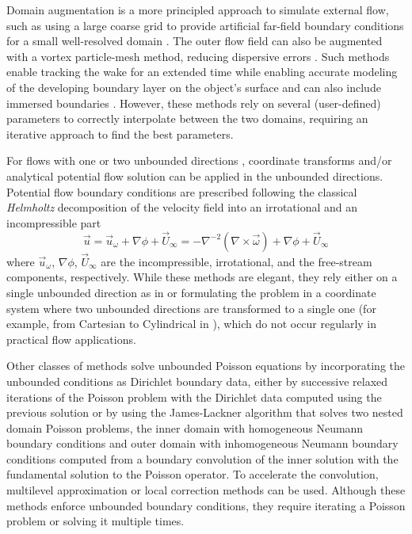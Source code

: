\documentclass[final,1p,times]{elsarticle}
\begin{document}
Domain augmentation is a more principled approach to simulate external flow, such as using a large coarse grid to provide artificial far-field boundary conditions for a small well-resolved domain \cite{Colonius2008}. The outer flow field can also be augmented with a vortex particle-mesh method, reducing dispersive errors \cite{Billuart2023AFlows}. Such methods enable tracking the wake for an extended time while enabling accurate modeling of the developing boundary layer on the object's surface and can also include immersed boundaries \cite{Marichal2015UnboundedMethods}. However, these methods rely on several (user-defined) parameters to correctly interpolate between the two domains, requiring an iterative approach to find the best parameters.

For flows with one \cite{Grosch1977NumericalTransforms} or two unbounded directions \cite{Rennich1997NumericalDirections, Levy2022SolvingMethod}, coordinate transforms and/or analytical potential flow solution \cite{Tsynkov1998NumericalReview} can be applied in the unbounded directions. Potential flow boundary conditions are prescribed following the classical \emph{Helmholtz} decomposition of the velocity field into an irrotational and an incompressible part
\begin{equation}\label{eq:u_vort}
    \vec{u} = \vec{u}_\omega + \nabla\phi + \vec{U}_\infty = -\nabla^{-2}\left(\nabla \times \vec{\omega}\right) + \nabla\phi + \vec{U}_\infty
\end{equation}
where $\vec{u}_\omega$, $\nabla\phi$, $\vec{U}_\infty$ are the incompressible, irrotational, and the free-stream components, respectively. While these methods are elegant, they rely either on a single unbounded direction as in \cite{Grosch1977NumericalTransforms} or formulating the problem in a coordinate system where two unbounded directions are transformed to a single one (for example, from Cartesian to Cylindrical in \cite{Levy2022SolvingMethod}), which do not occur regularly in practical flow applications.

Other classes of methods solve unbounded Poisson equations by incorporating the unbounded conditions as Dirichlet boundary data, either by successive relaxed iterations of the Poisson problem with the Dirichlet data computed using the previous solution \cite{Miller2008AnBoundaries} or by using the James-Lackner \cite{Jamb1977TheDistributions, Lackner1976COMPUTATIONEQUILIBRIA} algorithm that solves two nested domain Poisson problems, the inner domain with homogeneous Neumann boundary conditions and outer domain with inhomogeneous Neumann boundary conditions computed from a boundary convolution of the inner solution with the fundamental solution to the Poisson operator. To accelerate the convolution, multilevel approximation \cite{Mccorquodale2006ADimensions} or local correction methods \cite{Kavouklis2019ComputationCorrections} can be used. Although these methods enforce unbounded boundary conditions, they require iterating a Poisson problem or solving it multiple times. 
\end{document}

